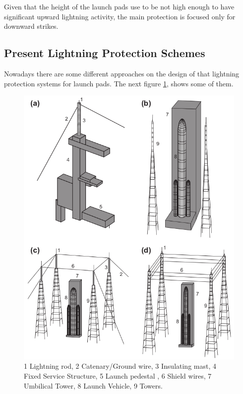 Given that the height of the launch pads use to be not high enough to have significant upward lightning activity, the main protection is focused only for downward strikes.

\subsection{Present Lightning Protection Schemes}

Nowadays there are some different approaches on the design of that lightning
protection systems for launch pads. The next figure \ref{fig:towers}\cite{RONGIER201327}, shows some
of them.

\begin{figure}[h!]
	\centering
	\includegraphics[width=\textwidth]{img/launchpad_towers.png}
	\caption[Launch pad lightning protection system schemes]
	{1 Lightning rod, 2 Catenary/Ground wire, 3 Insulating mast, 4 Fixed Service Structure, 5 Launch pedestal , 6 Shield wires, 7 Umbilical Tower, 8 Launch Vehicle, 9 Towers.}
	\label{fig:towers}
\end{figure}

